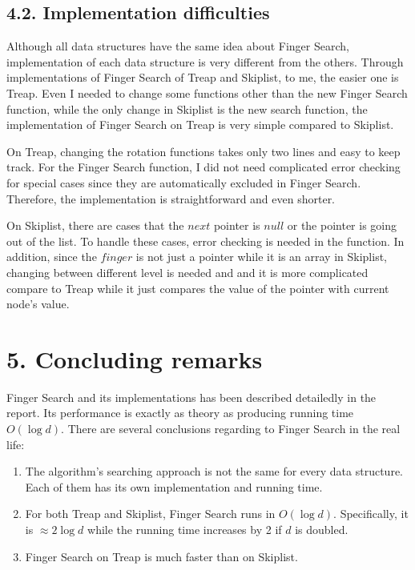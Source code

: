 \documentclass[12pt,english,]{article}
\providecommand{\tightlist}{%
  \setlength{\itemsep}{0pt}\setlength{\parskip}{0pt}}
\begin{document}
\hypertarget{implementation-difficulties}{%
\subsection{4.2. Implementation
difficulties}\label{implementation-difficulties}}

Although all data structures have the same idea about Finger Search,
implementation of each data structure is very different from the others.
Through implementations of Finger Search of Treap and Skiplist, to me,
the easier one is Treap. Even I needed to change some functions other
than the new Finger Search function, while the only change in Skiplist
is the new search function, the implementation of Finger Search on Treap
is very simple compared to Skiplist.

On Treap, changing the rotation functions takes only two lines and easy
to keep track. For the Finger Search function, I did not need
complicated error checking for special cases since they are
automatically excluded in Finger Search. Therefore, the implementation
is straightforward and even shorter.

On Skiplist, there are cases that the \(next\) pointer is \(null\) or
the pointer is going out of the list. To handle these cases, error
checking is needed in the function. In addition, since the \(finger\) is
not just a pointer while it is an array in Skiplist, changing between
different level is needed and and it is more complicated compare to
Treap while it just compares the value of the pointer with current
node's value.

\hypertarget{concluding-remarks}{%
\section{5. Concluding remarks}\label{concluding-remarks}}

Finger Search and its implementations has been described detailedly in
the report. Its performance is exactly as theory as producing running
time \(O(\log d)\). There are several conclusions regarding to Finger
Search in the real life:

\begin{enumerate}
\def\labelenumi{\arabic{enumi}.}
\tightlist
\item
  The algorithm's searching approach is not the same for every data
  structure. Each of them has its own implementation and running time.
\item
  For both Treap and Skiplist, Finger Search runs in \(O(\log d)\).
  Specifically, it is \(\approx 2\log d\) while the running time
  increases by 2 if \(d\) is doubled.
\item
  Finger Search on Treap is much faster than on Skiplist.
\end{enumerate}
\end{document}
